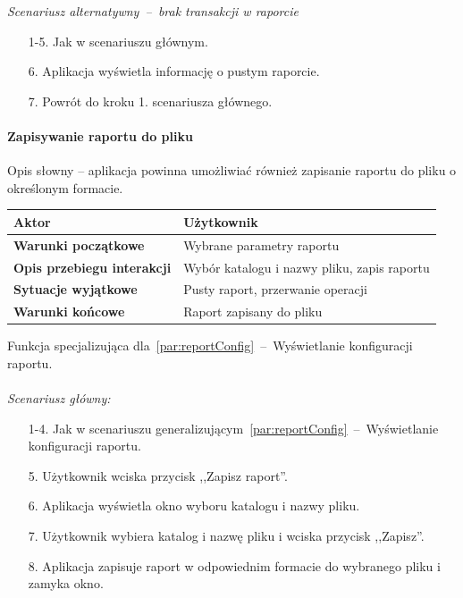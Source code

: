 \textit{Scenariusz alternatywny~--~brak transakcji w raporcie}
\begin{enumerate}
  \item[1-5.] Jak w scenariuszu głównym.
  \item[6.] Aplikacja wyświetla informację o pustym raporcie.
  \item[7.] Powrót do kroku 1. scenariusza głównego.
\end{enumerate}

\paragraph{Zapisywanie raportu do pliku\newline}
\label{par:reportExport}

Opis słowny -- aplikacja powinna umożliwiać również zapisanie raportu do pliku o określonym formacie.

\begin{longtable}{|p{5cm}|p{7cm}|}
 	\hline
	\textbf{Aktor} & Użytkownik \\
	\hline
	\textbf{Warunki początkowe} & Wybrane parametry raportu \\
	\hline
	\textbf{Opis przebiegu interakcji} & Wybór katalogu i nazwy pliku, zapis raportu \\
	\hline
	\textbf{Sytuacje wyjątkowe} & Pusty raport, przerwanie operacji \\
	\hline
	\textbf{Warunki końcowe} & Raport zapisany do pliku \\
	\hline
\end{longtable}

\indent Funkcja specjalizująca dla~\ref{par:reportConfig}~--~Wyświetlanie konfiguracji raportu.\\\\
\textit{Scenariusz główny:}
\begin{enumerate}
  \item[1-4.] Jak w scenariuszu generalizującym~\ref{par:reportConfig}~--~Wyświetlanie konfiguracji raportu.
  \item[5.] Użytkownik wciska przycisk ,,Zapisz raport''.
  \item[6.] Aplikacja wyświetla okno wyboru katalogu i nazwy pliku.
  \item[7.] Użytkownik wybiera katalog i nazwę pliku i wciska przycisk ,,Zapisz''.
  \item[8.] Aplikacja zapisuje raport w odpowiednim formacie do wybranego pliku i zamyka okno.
\end{enumerate}

